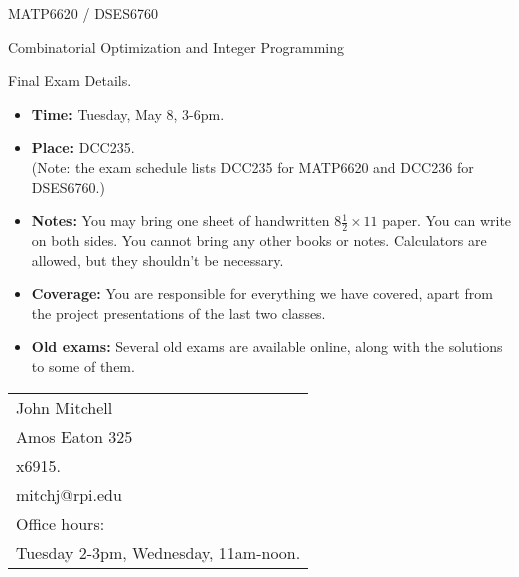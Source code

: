 \documentclass[12pt]{article}
\begin{document}
\begin{center}
  \begin{large}
     MATP6620 / DSES6760
  \end{large}
\end{center}


\begin{center}
  \begin{large}
Combinatorial Optimization and Integer Programming
  \end{large}
\end{center}


\begin{center}
  \begin{large}
       Final Exam Details.
  \end{large}
\end{center}


\vspace{\baselineskip}


\begin{itemize}
   \item
{\bf Time:} Tuesday, May 8, 3-6pm.
   \item
{\bf Place:} DCC235.  \\
(Note: the exam schedule lists DCC235 for MATP6620 and DCC236 for DSES6760.)
   \item
{\bf Notes:}
You may bring one sheet of handwritten $8\frac{1}{2} \times 11$
paper. You can write on both sides.
You cannot bring any other books or notes.
Calculators are allowed, but they shouldn't be necessary.
   \item
{\bf Coverage:}
You are responsible for everything we have covered,
apart from the project presentations of the last two classes.
   \item
{\bf Old exams:}
Several old exams are available online, along with the solutions to some of them.
\end{itemize}

\vfill

\begin{tabular}{@{\hspace{.5in}}l}
   John Mitchell  \\
   Amos Eaton 325  \\
   x6915.  \\
   mitchj@rpi.edu  \\
   Office hours:  \\
   Tuesday 2-3pm, Wednesday, 11am-noon.
\end{tabular}
\end{document}
